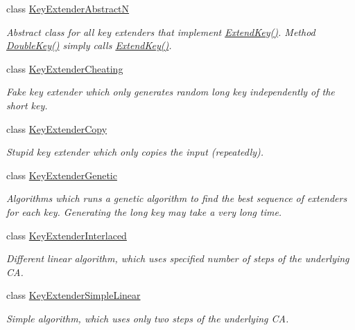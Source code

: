 \begin{DoxyCompactItemize}
class \hyperlink{class_crypto_1_1_key_extender_abstract_n}{Key\+Extender\+Abstract\+N}
\begin{DoxyCompactList}\small\item\em Abstract class for all key extenders that implement \hyperlink{class_crypto_1_1_key_extender_abstract_n_a9df4156ad0a84730f87119e5a25cf1ef}{Extend\+Key()}. Method \hyperlink{class_crypto_1_1_key_extender_abstract_n_a57e9a8247ebde9e639c16107c2961d10}{Double\+Key()} simply calls \hyperlink{class_crypto_1_1_key_extender_abstract_n_a9df4156ad0a84730f87119e5a25cf1ef}{Extend\+Key()}. \end{DoxyCompactList}\item 
class \hyperlink{class_crypto_1_1_key_extender_cheating}{Key\+Extender\+Cheating}
\begin{DoxyCompactList}\small\item\em Fake key extender which only generates random long key independently of the short key. \end{DoxyCompactList}\item 
class \hyperlink{class_crypto_1_1_key_extender_copy}{Key\+Extender\+Copy}
\begin{DoxyCompactList}\small\item\em Stupid key extender which only copies the input (repeatedly). \end{DoxyCompactList}\item 
class \hyperlink{class_crypto_1_1_key_extender_genetic}{Key\+Extender\+Genetic}
\begin{DoxyCompactList}\small\item\em Algorithms which runs a genetic algorithm to find the best sequence of extenders for each key. Generating the long key may take a very long time. \end{DoxyCompactList}\item 
class \hyperlink{class_crypto_1_1_key_extender_interlaced}{Key\+Extender\+Interlaced}
\begin{DoxyCompactList}\small\item\em Different linear algorithm, which uses specified number of steps of the underlying C\+A. \end{DoxyCompactList}\item 
class \hyperlink{class_crypto_1_1_key_extender_simple_linear}{Key\+Extender\+Simple\+Linear}
\begin{DoxyCompactList}\small\item\em Simple algorithm, which uses only two steps of the underlying C\+A. \end{DoxyCompactList}\item 

\end{DoxyCompactItemize}
